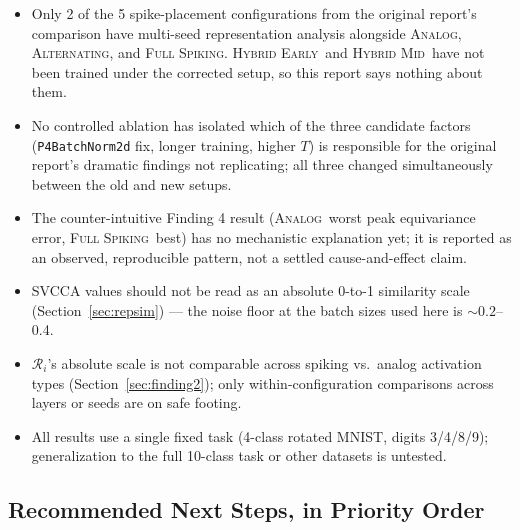 \documentclass[11pt]{article}
\newcommand{\Analog}{\textsc{Analog}}
\newcommand{\Alternating}{\textsc{Alternating}}
\newcommand{\FullSpiking}{\textsc{Full Spiking}}
\newcommand{\HybridEarly}{\textsc{Hybrid Early}}
\newcommand{\HybridMid}{\textsc{Hybrid Mid}}
\begin{document}
\begin{itemize}[leftmargin=1.5em]
\item Only 2 of the 5 spike-placement configurations from the original report's comparison have
multi-seed representation analysis alongside \Analog, \Alternating, and \FullSpiking. \HybridEarly\
and \HybridMid\ have not been trained under the corrected setup, so this report says nothing about
them.
\item No controlled ablation has isolated which of the three candidate factors (\texttt{P4BatchNorm2d}
fix, longer training, higher $T$) is responsible for the original report's dramatic findings not
replicating; all three changed simultaneously between the old and new setups.
\item The counter-intuitive Finding 4 result (\Analog\ worst peak equivariance error, \FullSpiking\
best) has no mechanistic explanation yet; it is reported as an observed, reproducible pattern, not a
settled cause-and-effect claim.
\item SVCCA values should not be read as an absolute 0-to-1 similarity scale (Section~\ref{sec:repsim})
--- the noise floor at the batch sizes used here is $\sim 0.2$--0.4.
\item $\mathcal{R}_i$'s absolute scale is not comparable across spiking vs.\ analog activation types
(Section~\ref{sec:finding2}); only within-configuration comparisons across layers or seeds are on
safe footing.
\item All results use a single fixed task (4-class rotated MNIST, digits 3/4/8/9); generalization to
the full 10-class task or other datasets is untested.
\end{itemize}

\subsection{Recommended Next Steps, in Priority Order}
\end{document}

